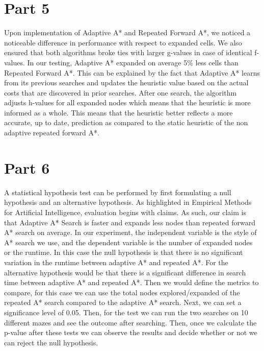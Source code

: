 \documentclass{article}
\begin{document}
\section*{Part 5}
Upon implementation of Adaptive A* and Repeated Forward A*, we noticed a noticeable difference in performance with respect to expanded cells. We also ensured that both algorithms broke ties with larger g-values in case of identical f-values. In our testing, Adaptive A* expanded on average 5\% less cells than Repeated Forward A*. This can be explained by the fact that Adaptive A* learns from its previous searches and updates the heuristic value based on the actual costs that are discovered in prior searches. After one search, the algorithm adjusts h-values for all expanded nodes which means that the heuristic is more informed as a whole. This means that the heuristic better reflects a more accurate, up to date, prediction as compared to the static heuristic of the non adaptive repeated forward A*.

\section*{Part 6}
A statistical hypothesis test can be performed by first formulating a null hypothesis and an alternative hypothesis. As highlighted in Empirical Methods for Artificial Intelligence, evaluation begins with claims. As such, our claim is that Adaptive A* Search is faster and expands less nodes than repeated forward A* search on average. In our experiment, the independent variable is the style of A* search we use, and the dependent variable is the number of expanded nodes or the runtime. In this case the null hypothesis is that there is no significant variation in the runtime between adaptive A* and repeated A*. For the alternative hypothesis would be that there is a significant difference in search time between adaptive A* and repeated A*. Then we would define the metrics to compare, for this case we can use the total nodes explored/expanded of the repeated A* search compared to the adaptive A* search. Next, we can set a significance level of 0.05. Then, for the test we can run the two searches on 10 different mazes and see the outcome after searching. Then, once we calculate the p-value after these tests we can observe the results and decide whether or not we can reject the null hypothesis. 
\end{document}
